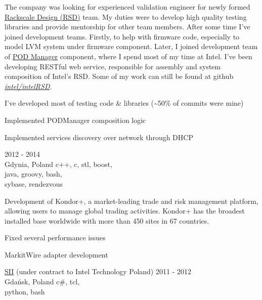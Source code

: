 \documentclass[a4paper,11pt]{cv4tw}%
\begin{document}
      {The company was looking for experienced validation engineer for newly formed \href{https://www.intel.com/intelRSD}{Rackscale Design (RSD)} team.
        My duties were to develop high quality testing libraries and provide mentorship for other team members.
        After some time I've joined development teams. Firstly, to help with firmware code, especially to model LVM system under firmware component.
        Later, I joined development team of
        \href{https://www.intel.com/content/www/us/en/architecture-and-technology/rack-scale-design/pod-manager-user-guide-v2-1.html}{POD Manager} component,
        where I spend most of my time at Intel. I've been developing RESTful web service, responsible for assembly and system composition of Intel's RSD. 
        Some of my work can still be found at github \emph{\href{https://github.com/intel/intelRSD}{intel/intelRSD}}.
        \begin{missions}
        \item I've developed most of testing code \& libraries (\textasciitilde50\% of commits were mine)
        \item Implemented PODManager composition logic
        \item Implemented services discovery over network through DHCP
        \end{missions}
      }      
      {2012 - 2014\\Gdynia, Poland}
      {c++, c, stl, boost,\\java, groovy, bash,\\sybase, rendezvous}
      {Development of Kondor+, a market-leading trade and risk management platform,
        allowing users to manage global trading activities. Kondor+ has the broadest
        installed base worldwide with more than 450 sites in 67 countries.
        \begin{missions}
        \item Fixed several performance issues
        \item MarkitWire adapter development
        \end{missions}
      }
      {\href{https://sii.pl/en/}{SII} (under contract to Intel Technology Poland)}
      {2011 - 2012\\Gdańsk, Poland}
      {c\#, tcl,\\python, bash}
\end{document}

